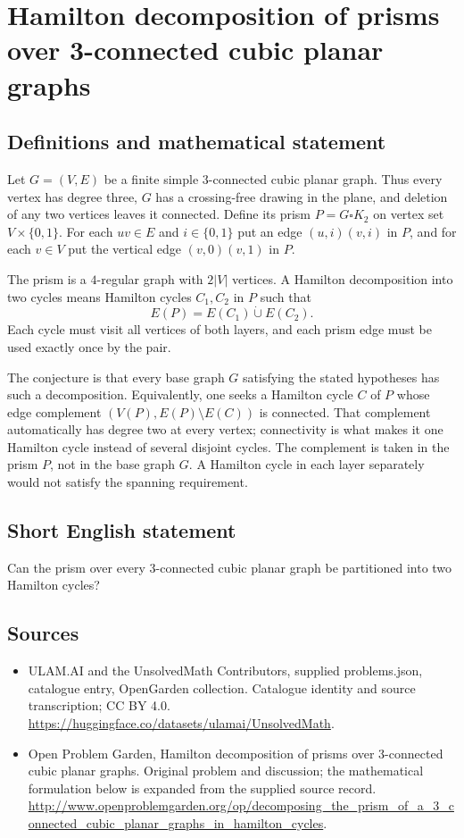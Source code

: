 \documentclass[11pt,a4paper]{article}
\begin{document}
\section*{Hamilton decomposition of prisms over 3-connected cubic planar graphs}\label{statement}

\subsection{Definitions and mathematical statement}
Let $G=(V,E)$ be a finite simple $3$-connected cubic planar
graph. Thus every vertex has degree three, $G$ has a
crossing-free drawing in the plane, and deletion of any
two vertices leaves it connected. Define its prism
$P=G\square K_2$ on vertex set $V\times\{0,1\}$.
For each $uv\in E$ and $i\in\{0,1\}$ put an edge
$(u,i)(v,i)$ in $P$, and for each $v\in V$ put the
vertical edge $(v,0)(v,1)$ in $P$.

The prism is a $4$-regular graph with $2|V|$ vertices.
A Hamilton decomposition into two cycles means Hamilton
cycles $C_1,C_2$ in $P$ such that
\[
 E(P)=E(C_1)\mathbin{\dot\cup}E(C_2).
\]
Each cycle must visit all vertices of both layers, and
each prism edge must be used exactly once by the pair.

The conjecture is that every base graph $G$ satisfying
the stated hypotheses has such a decomposition. Equivalently,
one seeks a Hamilton cycle $C$ of $P$ whose edge complement
$(V(P),E(P)\setminus E(C))$ is connected. That complement
automatically has degree two at every vertex; connectivity
is what makes it one Hamilton cycle instead of several
disjoint cycles. The complement is taken in the prism $P$,
not in the base graph $G$. A Hamilton cycle in each layer
separately would not satisfy the spanning requirement.
\subsection{Short English statement}
Can the prism over every 3-connected cubic planar graph be partitioned into two Hamilton cycles?
\subsection{Sources}
\begin{itemize}
\item[S1] ULAM.AI and the UnsolvedMath Contributors, supplied problems.json, catalogue entry, OpenGarden collection. Catalogue identity and source transcription; CC BY 4.0.
\url{https://huggingface.co/datasets/ulamai/UnsolvedMath}.
\item[S2] Open Problem Garden, Hamilton decomposition of prisms over 3-connected cubic planar graphs. Original problem and discussion; the mathematical formulation below is expanded from the supplied source record.
\url{http://www.openproblemgarden.org/op/decomposing_the_prism_of_a_3_connected_cubic_planar_graphs_in_hamilton_cycles}.
\end{itemize}
\end{document}
